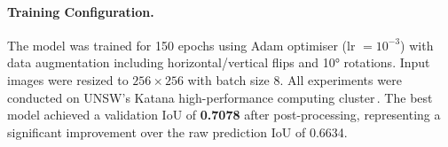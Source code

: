 \paragraph{Training Configuration.}
The model was trained for 150 epochs using Adam optimiser (lr $= 10^{-3}$) with data augmentation including horizontal/vertical flips and 10° rotations. Input images were resized to $256 \times 256$ with batch size 8. All experiments were conducted on UNSW's Katana high-performance computing cluster\,\cite{b18}. The best model achieved a validation IoU of \textbf{0.7078} after post-processing, representing a significant improvement over the raw prediction IoU of 0.6634.
